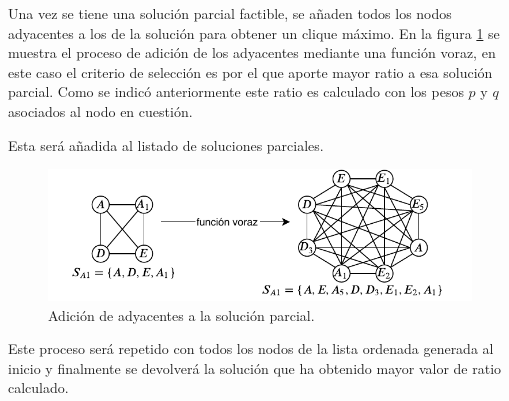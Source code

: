 Una vez se tiene una solución parcial factible, se añaden todos los nodos adyacentes a los de la solución para obtener un clique máximo. En la figura \ref{fig:bl:add-ayd} se muestra el proceso de adición de los adyacentes mediante una función voraz, en este caso el criterio de selección es por el que aporte mayor ratio a esa solución parcial. Como se indicó anteriormente este ratio es calculado con los pesos $p$ y $q$ asociados al nodo en cuestión.

 Esta será añadida al listado de soluciones parciales.

\begin{figure}[H]
	\centering
	\includegraphics[scale=1.3]{Figures/proc-bl/add-adys.pdf}
	\caption{\footnotesize Adición de adyacentes a la solución parcial.}
	\label{fig:bl:add-ayd}
\end{figure}

Este proceso será repetido con todos los nodos de la lista ordenada generada al inicio y finalmente se devolverá la solución que ha obtenido mayor valor de ratio calculado.

